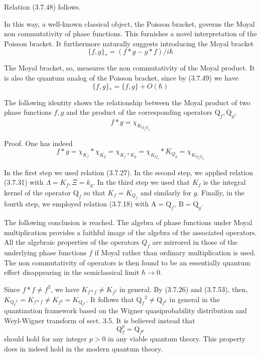 \documentclass{article}
\begin{document}
Relation (3.7.48) follows.

In this way, a well-known classical object, the Poisson bracket, governs the Moyal non commutativity of phase functions. This furnishes a novel interpretation of the Poisson bracket. It furthermore naturally suggests introducing the Moyal bracket
$$
\begin{equation*}
\{f, g\}_{*}=(f * g-g * f) / i \hbar \tag{3.7.51}
\end{equation*}
$$

The Moyal bracket, so, measures the non commutativity of the Moyal product. It is also the quantum analog of the Poisson bracket, since by (3.7.49) we have
$$
\begin{equation*}
\{f, g\}_{*}=\{f, g\}+O(\hbar) \tag{3.7.52}
\end{equation*}
$$

The following identity shows the relationship between the Moyal product of two phase functions $f, g$ and the product of the corresponding operators $\mathrm{Q}_{f}, \mathrm{Q}_{g}$,
$$
\begin{equation*}
f * g=\chi_{K_{Q_{f} Q_{g}}} \tag{3.7.53}
\end{equation*}
$$

Proof. One has indeed
$$
\begin{equation*}
f * g=\chi_{K_{f}} * \chi_{K_{g}}=\chi_{K_{f} * K_{g}}=\chi_{K_{Q_{f}}} * K_{Q_{g}}=\chi_{K_{Q_{f} Q_{g}}} \tag{3.7.54}
\end{equation*}
$$

In the first step we used relation (3.7.27). In the second step, we applied relation (3.7.31) with $\Lambda=K_{f}, \Xi=k_{g}$. In the third step we used that $K_{f}$ is the integral kernel of the operator $\mathrm{Q}_{f}$ so that $K_{f}=K_{Q_{f}}$ and similarly for $g$. Finally, in the fourth step, we employed relation (3.7.18) with $\mathrm{A}=\mathrm{Q}_{f}, \mathrm{~B}=\mathrm{Q}_{g}$.

The following conclusion is reached.
The algebra of phase functions under Moyal multiplication provides a faithful image of the algebra of the associated operators. All the algebraic properties of the operators $Q_{f}$ are mirrored in those of the underlying phase functions $f$ if Moyal rather than ordinary multiplication is used. The non commutativity of operators is then found to be an essentially quantum effect disappearing in the semiclassical limit $\hbar \rightarrow 0$.

Since $f * f \neq f^{2}$, we have $K_{f * f} \neq K_{f^{2}}$ in general. By (3.7.26) and (3.7.53), then, $K_{\mathrm{Q}_{f}{ }^{2}}=K_{f * f} \neq K_{f^{2}}=K_{\mathrm{Q}_{f^{2}}}$. It follows that $\mathrm{Q}_{f}{ }^{2} \neq \mathrm{Q}_{f^{2}}$ in general in the quantization framework based on the Wigner quasiprobability distribution and Weyl-Wigner transform of sect. 3.5. It is believed instead that
$$
\begin{equation*}
\mathrm{Q}_{f}^{p}=\mathrm{Q}_{f^{p}} \tag{3.7.55}
\end{equation*}
$$
should hold for any integer $p>0$ in any viable quantum theory. This property does in indeed hold in the modern quantum theory.
\end{document}

